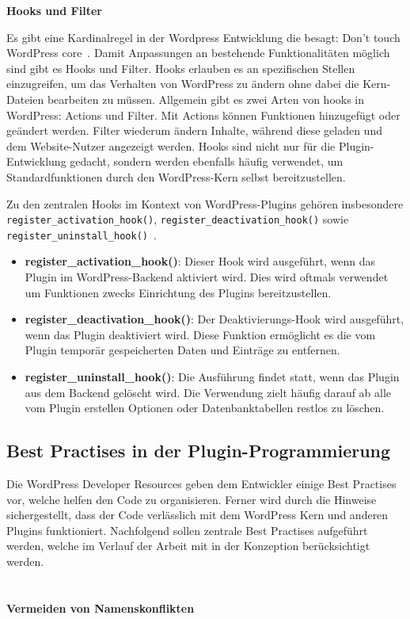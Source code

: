 \newpage
\textbf{Hooks und Filter}

Es gibt eine Kardinalregel in der Wordpress Entwicklung die besagt: Don’t touch WordPress core~\cite{wordpress2024Intro}.
Damit Anpassungen an bestehende Funktionalitäten möglich sind gibt es Hooks und Filter.
Hooks erlauben es an spezifischen Stellen einzugreifen, um das Verhalten von WordPress zu ändern ohne dabei die Kern-Dateien bearbeiten zu müssen.
Allgemein gibt es zwei Arten von hooks in WordPress: Actions und Filter.
Mit Actions können Funktionen hinzugefügt oder geändert werden.
Filter wiederum ändern Inhalte, während diese geladen und dem Website-Nutzer angezeigt werden.
Hooks sind nicht nur für die Plugin-Entwicklung gedacht, sondern werden ebenfalls häufig verwendet, um Standardfunktionen durch den WordPress-Kern selbst bereitzustellen.

Zu den zentralen Hooks im Kontext von WordPress-Plugins gehören insbesondere \texttt{register\_activation\_hook()}, \texttt{register\_deactivation\_hook()} sowie \\ \texttt{register\_uninstall\_hook()}~\cite{wordpress2024ActionsHooks}.

\begin{itemize}
 \item \textbf{register\_activation\_hook()}: Dieser Hook wird ausgeführt, wenn das Plugin im WordPress-Backend aktiviert wird. Dies wird oftmals verwendet um Funktionen zwecks Einrichtung des Plugins bereitzustellen.
 \item \textbf{register\_deactivation\_hook()}: Der Deaktivierungs-Hook wird ausgeführt, wenn das Plugin deaktiviert wird. Diese Funktion ermöglicht es die vom Plugin temporär gespeicherten Daten und Einträge zu entfernen.
 \item \textbf{register\_uninstall\_hook()}: Die Ausführung findet statt, wenn das Plugin aus dem Backend gelöscht wird. Die Verwendung zielt häufig darauf ab alle vom Plugin erstellen Optionen oder Datenbanktabellen restlos zu löschen.
\end{itemize}






\subsection{Best Practises in der Plugin-Programmierung}
Die WordPress Developer Resources geben dem Entwickler einige Best Practises vor, welche helfen den Code zu organisieren.
Ferner wird durch die Hinweise sichergestellt, dass der Code verlässlich mit dem WordPress Kern und anderen Plugins funktioniert.
Nachfolgend sollen zentrale Best Practises aufgeführt werden, welche im Verlauf der Arbeit mit in der Konzeption berücksichtigt werden.
\\
\\\\
\textbf{Vermeiden von Namenskonflikten}

